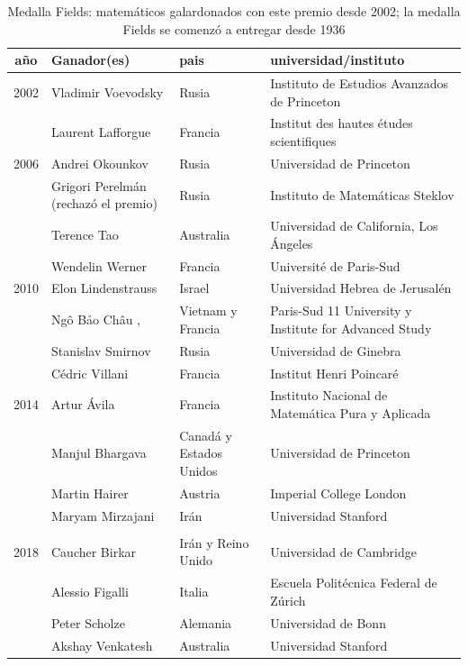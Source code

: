 \begin{table}%

\caption{Medalla Fields: matemáticos galardonados con este premio desde 2002; la medalla Fields se comenzó a entregar desde 1936}
\begin{center}
\begin{tabular}{cp{4cm}p{2.5cm}p{6cm}}
    \hline
    año & Ganador(es) & pais & universidad/instituto\\
    \hline 
    2002 & Vladimir Voevodsky  & Rusia &Instituto de Estudios Avanzados de Princeton \\
         & Laurent Lafforgue & Francia &Institut des hautes études scientifiques \\ 
         \hline
        2006 & Andrei Okounkov & Rusia & Universidad de Princeton\\
         & Grigori Perelmán (rechazó el premio) & Rusia & Instituto de Matemáticas Steklov\\
         & Terence Tao & Australia & Universidad de California, Los Ángeles \\
         & Wendelin Werner  & Francia & Université de Paris-Sud\\
         \hline
        2010 & Elon Lindenstrauss & Israel & Universidad Hebrea de Jerusalén\\
         & Ngô Bảo Châu ,  & Vietnam y Francia &Paris-Sud 11 University y Institute for Advanced Study \\
         & Stanislav Smirnov  & Rusia & Universidad de Ginebra\\
         & Cédric Villani & Francia & Institut Henri Poincaré\\
         \hline
         2014 & Artur Ávila  & Francia &Instituto Nacional de Matemática Pura y Aplicada \\
         & Manjul Bhargava  &  Canadá y Estados Unidos &Universidad de Princeton \\
         & Martin Hairer & Austria & Imperial College London\\
         & Maryam Mirzajani & Irán &Universidad Stanford \\
         \hline\\
         2018	 & Caucher Birkar & Irán y Reino Unido & Universidad de Cambridge \\
         & Alessio Figalli & Italia & Escuela Politécnica Federal de Zúrich \\
         & Peter Scholze & Alemania & Universidad de Bonn\\
         & Akshay Venkatesh  & Australia & Universidad Stanford\\
        \hline
\end{tabular}
\end{center}
\label{table:medalla_fields}
\end{table}

